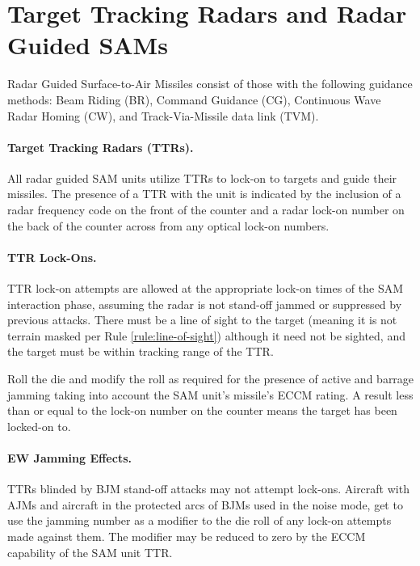 \section{Target Tracking Radars and Radar Guided SAMs}
\label{rule:radar-guided-sams}

Radar Guided Surface-to-Air Missiles consist of those with the following guidance methods: Beam Riding (BR), Command Guidance (CG), Continuous Wave Radar Homing (CW), and Track-Via-Missile data link (TVM).

\paragraph{Target Tracking Radars (TTRs).} All radar guided SAM units utilize TTRs to lock-on to targets and guide their missiles. The presence of a TTR with the unit is indicated by the inclusion of a radar frequency code on the front of the counter and a radar lock-on number on the back of the counter across from any optical lock-on numbers.

\paragraph{TTR Lock-Ons.} 

TTR lock-on attempts are allowed at the appropriate lock-on times of the SAM interaction phase, assuming the radar is not stand-off jammed or suppressed by previous attacks. There must be a line of sight to the target (meaning it is not terrain masked per Rule \ref{rule:line-of-sight}) although it need not be sighted, and the target must be within tracking range of the TTR.

Roll the die and modify the roll as required for the presence of active and barrage jamming taking into account the SAM unit's missile's ECCM rating. A result less than or equal to the lock-on number on the counter means the target has been locked-on to.               

\paragraph{EW Jamming Effects.} TTRs blinded by BJM stand-off attacks may not attempt lock-ons. Aircraft with AJMs and aircraft in the protected arcs of BJMs used in the noise mode, get to use the jamming number as a modifier to the die roll of any lock-on attempts made against them. The modifier may be reduced to zero by the ECCM capability of the SAM unit TTR.

